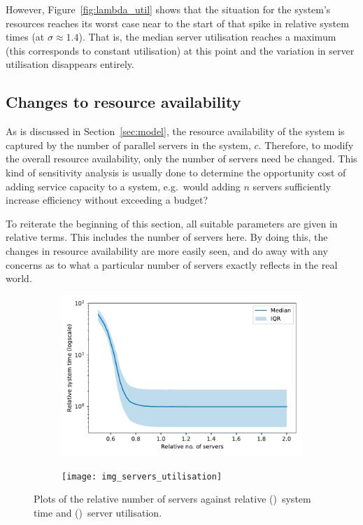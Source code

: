 \documentclass[11pt]{article}
\newlength{\imgwidth}
\begin{document}
However, Figure~\ref{fig:lambda_util} shows that the situation for the system's
resources reaches its worst case near to the start of that spike in relative
system times (at \(\sigma \approx 1.4\)). That is, the median server utilisation
reaches a maximum (this corresponds to constant utilisation) at this point and
the variation in server utilisation disappears entirely.


\subsection{Changes to resource availability}\label{subsec:resources}

As is discussed in Section~\ref{sec:model}, the resource availability of the
system is captured by the number of parallel servers in the system, \(c\).
Therefore, to modify the overall resource availability, only the number of
servers need be changed. This kind of sensitivity analysis is usually done to
determine the opportunity cost of adding service capacity to a system, e.g.\
would adding \(n\) servers sufficiently increase efficiency without exceeding
a budget?

To reiterate the beginning of this section, all suitable parameters are given in
relative terms. This includes the number of servers here. By doing this, the
changes in resource availability are more easily seen, and do away with any
concerns as to what a particular number of servers exactly reflects in the real
world.

\begin{figure}
    \centering
    \begin{subfigure}{.5\imgwidth}
        \includegraphics[width=\linewidth]{img_servers_time}
        \caption{}\label{fig:servers_time}
    \end{subfigure}\hfill%
    \begin{subfigure}{.5\imgwidth}
        \texttt{[image: img\_servers\_utilisation]}
        \caption{}\label{fig:servers_util}
    \end{subfigure}
    \caption{%
        Plots of the relative number of servers against relative
        (\subref{fig:servers_time})~system time and
        ()~server utilisation.
    }\label{fig:servers}
\end{figure}
\end{document}
